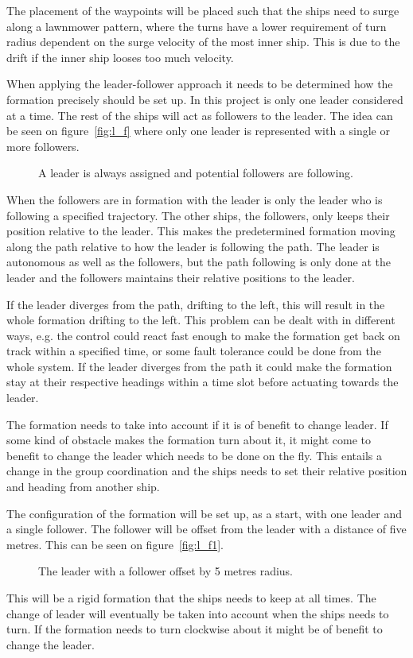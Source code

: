 The placement of the waypoints will be placed such that the ships need to surge along a lawnmower pattern, where the turns have a lower requirement of turn radius dependent on the surge velocity of the most inner ship. This is due to the drift if the inner ship looses too much velocity.

When applying the leader-follower approach it needs to be determined how the formation precisely should be set up. In this project is only one leader considered at a time. The rest of the ships will act as followers to the leader. The idea can be seen on figure~\vref{fig:l_f} where only one leader is represented with a single or more followers.
\begin{figure}[htbp]
	\centering
	
	\caption{A leader is always assigned and potential followers are following.}
	\label{fig:l_f}
\end{figure}
When the followers are in formation with the leader is only the leader who is following a specified trajectory. The other ships, the followers, only keeps their position relative to the leader. This makes the predetermined formation moving along the path relative to how the leader is following the path. The leader is autonomous as well as the followers, but the path following is only done at the leader and the followers maintains their relative positions to the leader.

If the leader diverges from the path, drifting to the left, this will result in the whole formation drifting to the left. This problem can be dealt with in different ways, e.g. the control could react fast enough to make the formation get back on track within a specified time, or some fault tolerance could be done from the whole system. If the leader diverges from the path it could make the formation stay at their respective headings within a time slot before actuating towards the leader.

The formation needs to take into account if it is of benefit to change leader. If some kind of obstacle makes the formation turn about it, it might come to benefit to change the leader which needs to be done on the fly. This entails a change in the group coordination and the ships needs to set their relative position and heading from another ship.

The configuration of the formation will be set up, as a start, with one leader and a single follower. The follower will be offset from the leader with a distance of five metres. This can be seen on figure~\vref{fig:l_f1}.
\begin{figure}[htbp]
	\centering
	
	\caption{The leader with a follower offset by 5 metres radius.}
	\label{fig:l_f1}
\end{figure}
This will be a rigid formation that the ships needs to keep at all times. The change of leader will eventually be taken into account when the ships needs to turn. If the formation needs to turn clockwise about it might be of benefit to change the leader. 

